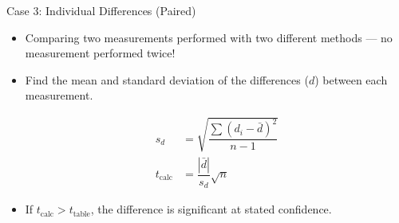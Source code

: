 \documentclass[handout]{beamer}
\begin{document}
\begin{frame}{Case 3: Individual Differences (Paired)}
	\begin{itemize}
		\item Comparing two measurements performed with two different
			methods --- no measurement performed twice!
		\item Find the mean and standard deviation of the
			\alert{differences} ($d$) between each measurement.

			\begin{align*}
				s_d & = \sqrt{\dfrac{\sum{(d_i -
				\bar{d})}^2}{n-1}} \\
				t_{\text{calc}} &= \dfrac{|\bar{d}|}{s_d}
				\sqrt{n}
			\end{align*}

		\item If $t_{\text{calc}} > t_{\text{table}}$, the difference is
			significant at stated confidence.
	\end{itemize}
\end{frame}
\end{document}

